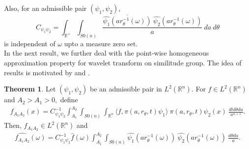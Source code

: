 \documentclass[11pt,reqno]{amsart}
\numberwithin{equation}{section}
\theoremstyle{definition}
\newtheorem{thm}{\sc Theorem}[section]
\begin{document}
Also, for an admissible pair $(\psi_1,\psi_2)$,
$$C_{\psi_1\psi_2} = \int_{\mathbb{R}^{+}}\int_{S0(n)}\frac{\overline{\widehat{\psi_1}(ar_\theta^{-1}(\omega))}\ \widehat{\psi_2}(ar_\theta^{-1}(\omega))}{a}\ da\ d\theta$$ 
is independent of $\omega$ upto a measure zero set.\\
\noindent In the next result, we further deal with the point-wise homogeneous approximation property for wavelet transform on similitude group. The idea of  results is motivated by \cite{Liu:09} and \cite{yu;16}.   
 \begin{thm}
Let $(\psi_1,\psi_2)$ be an admissible pair in $L^2(\mathbb{R}^n)$. For $f\in L^2(\mathbb{R}^n)$ and $A_2 > A_1 > 0,$ define
\begin{align*}
f_{A_1A_2}(x)= C_{\psi_1\psi_2}^{-1}\int_{A_1}^{A_2}\int_{S0(n)}\int_{\mathbb{R}^n} \langle f, \pi(a,r_{\theta},t)\psi_1\rangle\ \pi(a,r_{\theta},t)\psi_2(x)\ \frac{dtd\theta da}{a^{n+1}}.
\end{align*}
Then, $f_{A_1A_2} \in L^2(\mathbb{R}^n)$ and
\begin{align*}
\widehat{{f_{A_1A_2}}}(\omega) = C_{\psi_1\psi_2}^{-1}\widehat{f}(\omega)\int_{A_1}^{A_2}\int_{S0(n)} \widehat{\psi_{1}}(ar_\theta^{-1}(\omega))\ \widehat{\psi_2}(ar_\theta^{-1}(\omega))\ \frac{d\theta da}{a}.
\end{align*}
\end{thm}
\end{document}
